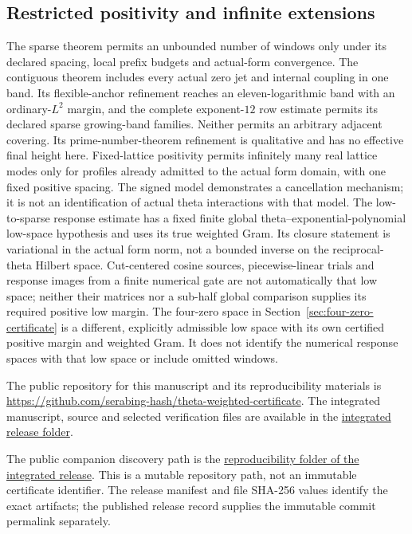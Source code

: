 \documentclass[11pt,a4paper]{article}
\numberwithin{equation}{section}
\theoremstyle{definition}\newtheorem{definition}[theorem]{Definition}
\theoremstyle{remark}\newtheorem{remark}[theorem]{Remark}
\begin{document}
\subsection{Restricted positivity and infinite extensions}
The sparse theorem permits an unbounded number of windows only under its declared spacing, local prefix budgets and actual-form convergence. The contiguous theorem includes every actual zero jet and internal coupling in one band. Its flexible-anchor refinement reaches an eleven-logarithmic band with an ordinary-$L^2$ margin, and the complete exponent-$12$ row estimate permits its declared sparse growing-band families. Neither permits an arbitrary adjacent covering. Its prime-number-theorem refinement is qualitative and has no effective final height here. Fixed-lattice positivity permits infinitely many real lattice modes only for profiles already admitted to the actual form domain, with one fixed positive spacing. The signed model demonstrates a cancellation mechanism; it is not an identification of actual theta interactions with that model. The low-to-sparse response estimate has a fixed finite global theta--exponential-polynomial low-space hypothesis and uses its true weighted Gram. Its closure statement is variational in the actual form norm, not a bounded inverse on the reciprocal-theta Hilbert space. Cut-centered cosine sources, piecewise-linear trials and response images from a finite numerical gate are not automatically that low space; neither their matrices nor a sub-half global comparison supplies its required positive low margin. The four-zero space in Section~\ref{sec:four-zero-certificate} is a different, explicitly admissible low space with its own certified positive margin and weighted Gram. It does not identify the numerical response spaces with that low space or include omitted windows.

The public repository for this manuscript and its reproducibility materials is \url{https://github.com/serabing-hash/theta-weighted-certificate}. The integrated manuscript, source and selected verification files are available in the \href{https://github.com/serabing-hash/theta-weighted-certificate/tree/main/papers/2026-11-03-unified-theta-energy-v2}{integrated release folder}.

The public companion discovery path is the \href{https://github.com/serabing-hash/theta-weighted-certificate/tree/main/papers/2026-11-03-unified-theta-energy-v2/reproducibility}{reproducibility folder of the integrated release}. This is a mutable repository path, not an immutable certificate identifier. The release manifest and file SHA-256 values identify the exact artifacts; the published release record supplies the immutable commit permalink separately.
\end{document}
